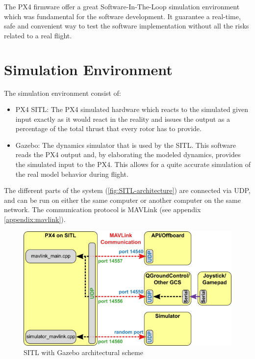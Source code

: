The PX4 firmware offer a great Software-In-The-Loop  simulation environment which was fundamental for the software development. It guarantee a real-time, safe and convenient way to test the software implementation without all the risks related to a real flight.\\

\section{Simulation Environment} %
\label{sec:simulation_environment}
The simulation environment consist of:
\begin{itemize}
 	\item PX4 SITL: The PX4 simulated hardware which reacts to the simulated given input exactly as it would react in the reality and issues the output as a percentage of the total thrust that every rotor has to provide.
 	\item Gazebo: The dynamics simulator that is used by the SITL. This software reads the PX4 output and, by elaborating the modeled dynamics, provides the simulated input to the PX4. This allows for a quite accurate simulation of the real model behavior during flight.
 \end{itemize}
 The different parts of the system (\autoref{fig:SITL-architecture}) are connected via UDP, and can be run on either the same computer or another computer on the same network. The communication protocol is MAVLink (see appendix \ref{appendix:mavlink}).
 \begin{figure}[ht]
    \centering
    \includegraphics[width=.7\textwidth]{figures/C4/Px4_sitl_overview}
    \caption{SITL with Gazebo architectural scheme}
    \label{fig:SITL-architecture}
\end{figure}

